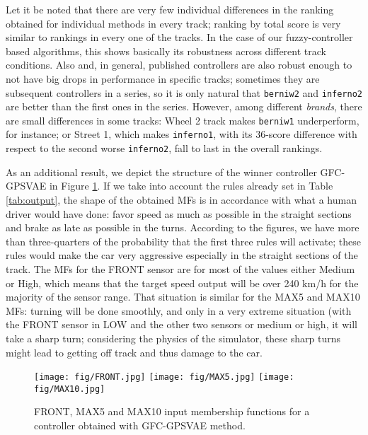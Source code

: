 \documentclass[10pt,journal,compsoc]{IEEEtran}
\begin{document}
Let it be noted that there are very few individual
  differences in the ranking obtained for individual methods in every
  track; ranking by total score is very similar to rankings in every
  one of the tracks. In the case of our fuzzy-controller based
  algorithms, this shows basically its robustness across different
  track conditions. Also and, in general, published controllers are also robust
  enough to not have big drops in performance in specific
  tracks; sometimes they are subsequent controllers in a series, so
  it is only natural that {\tt berniw2} and {\tt inferno2} are better
  than the first ones in the series. However, among different {\em
    brands}, there are small differences in some tracks: {\sf
    Wheel 2} track makes {\tt berniw1} underperform, for instance; or
  {\sf Street 1}, which makes {\tt inferno1}, with its 36-score
  difference with respect to the second worse {\tt inferno2}, fall to
  last in the overall rankings.


As an additional result, we depict the structure of the winner controller {\sf GFC-GPSVAE} in Figure \ref{fig:frontmfs}. 
If we take into account the rules already set in Table
\ref{tab:output}, the shape of the obtained MFs  is in accordance with
what a human driver would have done: favor speed as much as possible
in the straight sections and brake as late as possible in the turns. 
According to the figures, we have more than three-quarters of the probability that the first three rules will activate; these rules
would make the car very aggressive especially in the straight sections
of the track. The MFs for the FRONT sensor are for most of the values
either Medium or High, which means that the target speed output will
be over 240 km/h for the majority of the sensor range. 
That situation is similar for the MAX5 and MAX10 MFs: turning will be done smoothly, and only in a very extreme situation (with the FRONT sensor in LOW and
the other two sensors or medium or high, it will take a sharp turn;
considering the physics of the simulator, these sharp turns might lead
to getting off track and thus damage to the car.

%
\begin{figure}[h]	
  \begin{center}
    \texttt{[image: fig/FRONT.jpg]}
    \texttt{[image: fig/MAX5.jpg]}
    \texttt{[image: fig/MAX10.jpg]}		
    \caption{FRONT, MAX5 and MAX10 input membership functions for a controller obtained with {\sf GFC-GPSVAE} method.}
    \label{fig:frontmfs}
\end{center}	
\end{figure}
\end{document}
